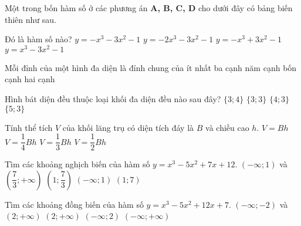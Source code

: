 \begin{ex}%
Một trong bốn hàm số ở các phương án {\bf A, B, C, D} cho dưới đây có bảng biến thiên như sau. 
	\begin{center}
		\end{center}	
		
Đó là hàm số nào?
	\choice
	{$y=-x^3-3x^2-1$}
	{$y=-2x^3-3x^2-1$}
	{$y=-x^3+3x^2-1$}
	{\True $y=x^3-3x^2-1$}
\end{ex} 
\begin{ex}%
	Mỗi đỉnh của một hình đa diện là đỉnh chung của ít nhất
	\choice
	{\True ba cạnh}
	{năm cạnh}
	{bốn cạnh}
	{hai cạnh}
\end{ex}
\begin{ex}%
	Hình bát diện đều thuộc loại khối đa diện đều nào sau đây?
	\choice
	{\True $\{3;4\}$}
	{$\{3;3\}$}
	{$\{4;3\}$}
	{$\{5;3\}$}
\end{ex}
\begin{ex}%
	Tính thể tích $V$ của khối lăng trụ có diện tích đáy là $B$ và chiều cao $h$.
	\choice
	{\True $V=Bh$}
	{$V=\dfrac{1}{4}Bh$}
	{$V=\dfrac{1}{3}Bh$}
	{$V=\dfrac{1}{2}Bh$}
\end{ex}
\begin{ex}%
	Tìm các khoảng nghịch biến của hàm số $y=x^3-5x^2+7x+12$.
	\choice
	{$\left(-\infty;1\right)$ và $\left(\dfrac{7}{3};+\infty\right)$}
	{\True $\left(1;\dfrac{7}{3}\right)$}
	{$\left(-\infty;1\right)$}
	{$\left(1;7\right)$}
\end{ex}
\begin{ex}%
	Tìm các khoảng đồng biến của hàm số $y=x^3-5x^2+12x+7$.
	\choice
	{$\left(-\infty;-2\right)$ và $\left(2;+\infty\right)$}
	{$\left(2;+\infty\right)$}
	{$\left(-\infty;2\right)$}
	{\True $\left(-\infty;+\infty\right)$}
\end{ex}
